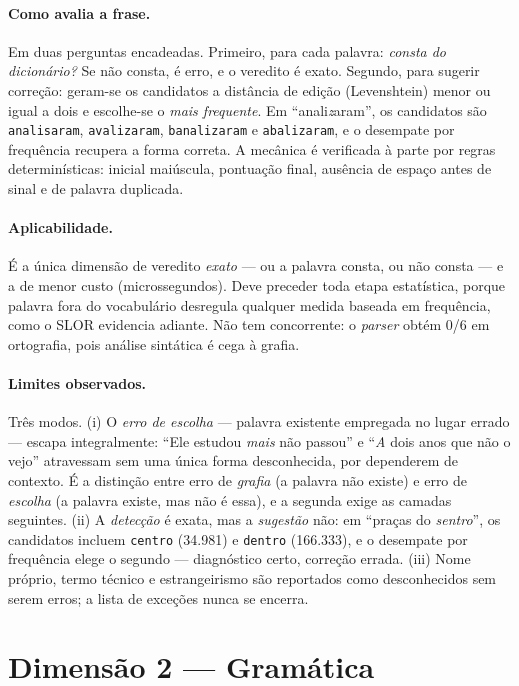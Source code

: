\documentclass[11pt,a4paper]{article}
\begin{document}
\paragraph{Como avalia a frase.} Em duas perguntas encadeadas. Primeiro, para cada palavra:
\emph{consta do dicionário?} Se não consta, é erro, e o veredito é exato. Segundo, para sugerir
correção: geram-se os candidatos a distância de edição (Levenshtein) menor ou igual a dois e
escolhe-se o \emph{mais frequente}. Em ``anali\emph{z}aram'', os candidatos são \texttt{analisaram},
\texttt{avalizaram}, \texttt{banalizaram} e \texttt{abalizaram}, e o desempate por frequência
recupera a forma correta. A mecânica é verificada à parte por regras determinísticas: inicial
maiúscula, pontuação final, ausência de espaço antes de sinal e de palavra duplicada.

\paragraph{Aplicabilidade.} É a única dimensão de veredito \emph{exato} --- ou a palavra consta, ou
não consta --- e a de menor custo (microssegundos). Deve preceder toda etapa estatística, porque
palavra fora do vocabulário desregula qualquer medida baseada em frequência, como o SLOR evidencia
adiante. Não tem concorrente: o \textit{parser} obtém 0/6 em ortografia, pois análise sintática é
cega à grafia.

\paragraph{Limites observados.} Três modos. (i) O \emph{erro de escolha} --- palavra existente
empregada no lugar errado --- escapa integralmente: ``Ele estudou \emph{mais} não passou'' e
``\emph{A} dois anos que não o vejo'' atravessam sem uma única forma desconhecida, por dependerem de
contexto. É a distinção entre erro de \emph{grafia} (a palavra não existe) e erro de \emph{escolha}
(a palavra existe, mas não é essa), e a segunda exige as camadas seguintes. (ii) A \emph{detecção} é
exata, mas a \emph{sugestão} não: em ``praças do \emph{sentro}'', os candidatos incluem
\texttt{centro} (34.981) e \texttt{dentro} (166.333), e o desempate por frequência elege o segundo
--- diagnóstico certo, correção errada. (iii) Nome próprio, termo técnico e estrangeirismo são
reportados como desconhecidos sem serem erros; a lista de exceções nunca se encerra.

\section{Dimensão 2 --- Gramática}
\end{document}
